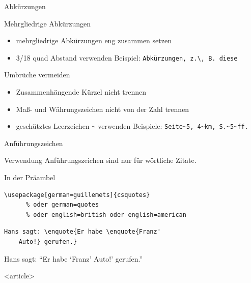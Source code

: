 \begin{Frame}[fragile]{Abkürzungen}
  \begin{Block}{Mehrgliedrige Abkürzungen}
    \begin{itemize}
      \item mehrgliedrige Abkürzungen eng zusammen setzen
      \item 3/18 quad Abstand verwenden\newline
        Beispiel: \lstinline-Abkürzungen, z.\, B. diese-
    \end{itemize}
  \end{Block}
  
  \begin{Block}{Umbrüche vermeiden}
    \begin{itemize}
      \item Zusammenhängende Kürzel nicht trennen
      \item Maß- und Währungszeichen nicht von der Zahl trennen
      \item geschütztes Leerzeichen \lstinline-~- verwenden\newline
        Beispiele: \lstinline-Seite~5, 4~km, S.~5~ff.-
    \end{itemize}
  \end{Block}
\end{Frame}

\begin{Frame}[fragile]{Anführungszeichen}
  \begin{alertblock}{Verwendung}
    Anführungszeichen sind nur für \alert{wörtliche Zitate}.
  \end{alertblock}
  
  \begin{Block}{In der Präambel}
    \begin{lstlisting}[gobble=6,style=block]
      \usepackage[german=guillemets]{csquotes}
      % oder german=quotes
      % oder english=british oder english=american
    \end{lstlisting}
  \end{Block}

  \begin{lstlisting}[gobble=4]
    Hans sagt: \enquote{Er habe \enquote{Franz'
    Auto!} gerufen.}
  \end{lstlisting}

  Hans sagt: \enquote{Er habe \enquote{Franz' Auto!} gerufen.}
\end{Frame}

\mode
<article>

